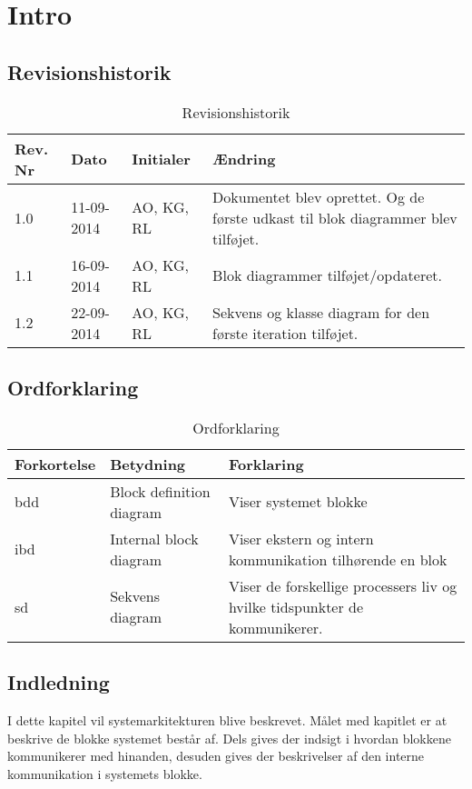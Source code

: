 \chapter{Intro}

\section{Revisionshistorik}
\begin{table}[H]
	\centering
		\begin{tabular}{|p{2 cm}|p{2 cm}|p{3 cm}|p{6 cm}|} 
		\hline
			\textbf{Rev. Nr} & \textbf{Dato}		& \textbf{Initialer} 	& \textbf{Ændring} \\ \hline
			1.0 	& 11-09-2014 & AO, KG, RL  & Dokumentet blev oprettet. Og de første udkast til blok diagrammer blev tilføjet.  \\ \hline
			1.1 	& 16-09-2014 & AO, KG, RL  & Blok diagrammer tilføjet/opdateret. 	\\ \hline
			1.2 	& 22-09-2014 & AO, KG, RL  & Sekvens og klasse diagram for den første iteration tilføjet.	\\ \hline
		\end{tabular}
	\caption{Revisionshistorik}
\end{table}

\vspace{1.5cm}

\section{Ordforklaring}
\begin{table}[H]
	\centering
		\begin{tabular}{|p{2.5cm}|p{4.5 cm}|p{6.5 cm}|} 
		\hline
			\textbf{Forkortelse} & \textbf{Betydning} & \textbf{Forklaring} \\ \hline
			 bdd& Block definition diagram  & Viser systemet blokke  \\ \hline
			 ibd& Internal block diagram & Viser ekstern og intern kommunikation tilhørende en blok \\ \hline
			 sd& Sekvens diagram & Viser de forskellige processers liv og hvilke tidspunkter de kommunikerer. \\ \hline
		\end{tabular}
	\caption{Ordforklaring}
\end{table}

\vspace{2cm}

\section{Indledning}
I dette kapitel vil systemarkitekturen blive beskrevet. Målet med kapitlet er at beskrive de blokke systemet består af. Dels gives der indsigt i hvordan blokkene kommunikerer med hinanden, desuden gives der beskrivelser af den interne kommunikation i systemets blokke. 